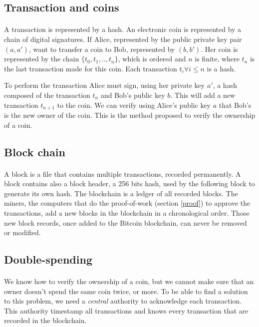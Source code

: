 \documentclass[letterpaper]{article}
\begin{document}
\subsection{Transaction and coins}
\paragraph{}
A transaction is represented by a hash.
An electronic coin is represented by a
chain of digital signatures\cite{bitcoin}.
If Alice, represented by the public private key pair $(a, a')$,
want to transfer a coin to Bob, represented by $(b, b')$. Her coin
is represented by the chain $\{t_0, t_1, .., t_n \}$, which is ordered
and $n$ is finite, where
$t_n$ is the last transaction made for this coin. Each transaction
$t_i \forall i \le n$ is a hash.

To perform the transaction
Alice must sign, using
her private key $a'$,
a hash composed of the transaction $t_n$ and Bob's public key $b$.
This will add a new
transaction $t_{n+1}$ to the coin. We can verify using Alice's public key $a$
that Bob's is the new owner of the coin.
This is the method proposed to verify the ownership of a coin.

\subsection{Block chain}
\paragraph{}
A block is a file that contains multiple transactions,
recorded permanently\cite{blockwiki}. A block contains also a block header,
a 256 bits hash, used by the following block to generate its own hash.
The blockchain is a ledger of all
recorded blocks. The miners, the computers that do the proof-of-work
(section \ref{proof}) to
approve the transactions, add a new blocks in the blockchain in a
chronological order. Those new block records,
once added to the Bitcoin blockchain, can never be removed or modified.



\subsection{Double-spending}
\paragraph{}
We know how to verify the ownership of a coin, but we cannot make sure
that an owner doesn't spend the same coin twice, or more.
To be able to find a solution to this problem, we need a \textit{central}
authority to acknowledge each transaction. This authority timestamp all
transactions and knows every transaction that are recorded in the blockchain.
\end{document}
